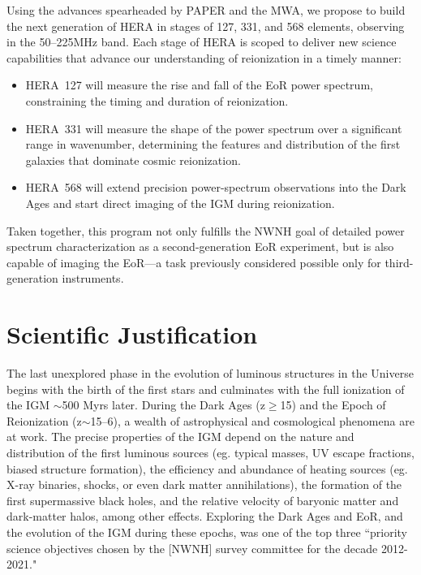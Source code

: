 \documentclass[preprint]{aastex}
\begin{document}
Using the advances spearheaded by
PAPER and the MWA,
we propose to build the next generation of HERA in stages of 127, 331, and 568 elements,
observing in the 50--225MHz band.
Each stage of HERA is scoped to deliver new science capabilities that advance our
understanding of reionization in a timely manner:
\vspace{-7pt}
\begin{itemize}\setlength{\parskip}{0pt}\itemsep0pt
\item HERA~127 will measure the rise and fall of the EoR power
spectrum, constraining the timing and duration of reionization.
\item HERA~331 will measure the shape of the power spectrum over
a significant range in wavenumber, determining the features and distribution of
the first galaxies that dominate cosmic reionization.
\item HERA~568 will extend precision power-spectrum observations
into the Dark Ages and start direct imaging of the IGM during reionization.
\end{itemize}
{ \setlength{\parindent}{0cm}
Taken together, this program
not only fulfills the NWNH goal of detailed power spectrum
characterization as a second-generation EoR experiment, but is also
capable of imaging the EoR---a task previously considered possible only for
third-generation instruments.}

\vspace{-0.25in}
\section{Scientific Justification}
\label{SJsec}

The last unexplored phase in the evolution of luminous structures in the
Universe begins with the birth of the first stars and culminates with the full
ionization of the IGM $\sim$500 Myrs later.  During the Dark Ages
(z$\ge$15) and the Epoch of Reionization (z$\sim$15--6), a wealth of
astrophysical and cosmological phenomena are at work.  The precise properties
of the IGM depend on the nature and distribution of the first luminous sources
(eg. typical masses, UV escape fractions, biased structure formation), the
efficiency and abundance of heating sources (eg.  X-ray binaries, shocks, or
even dark matter annihilations), the formation of the first supermassive black
holes, and the relative velocity of baryonic matter and dark-matter halos,
among other effects.  Exploring the Dark Ages and EoR, and the evolution of
the IGM during these epochs, was one of the top three
``priority science objectives chosen by the [NWNH] survey committee for the
decade 2012-2021."
\end{document}
